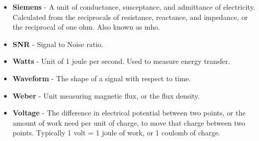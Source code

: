 \documentclass[12pt]{article}
\begin{document}
\begin{itemize}
    \item \textbf{Siemens} - A unit of conductance, susceptance, and admittance of electricity. Calculated from the reciprocals of resistance, reactance, and impedance, or the reciprocal of one ohm. Also known as mho.
    \item \textbf{SNR} - Signal to Noise ratio. 
    \item \textbf{Watts} - Unit of 1 joule per second. Used to measure energy transfer.
    \item \textbf{Waveform} - The shape of a signal with respect to time. 
    \item \textbf{Weber} - Unit measuring magnetic flux, or the flux density. 
    \item \textbf{Voltage} - The difference in electrical potential between two points, or the amount of work need per unit of charge, to move that charge between two points. Typically 1 volt = 1 joule of work, or 1 coulomb of charge. 
\end{itemize}
\end{document}
